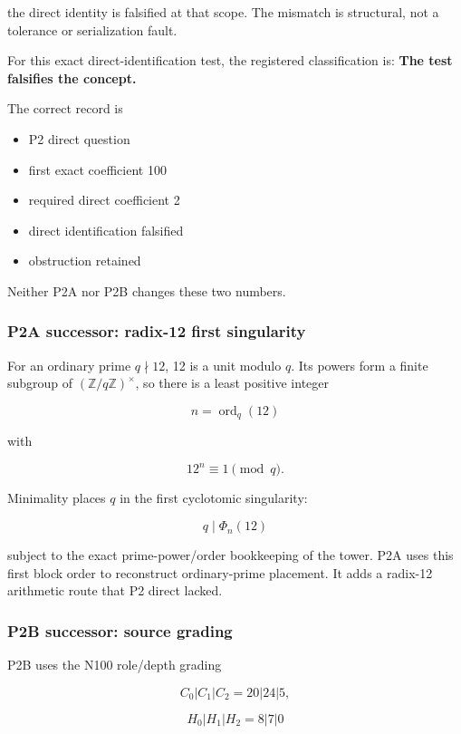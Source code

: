 the direct identity is falsified at that scope. The mismatch is
structural, not a tolerance or serialization fault.

For this exact direct-identification test, the registered classification
is: \textbf{The test falsifies the concept.}

The correct record is

\begin{itemize}
\tightlist
\item
  P2 direct question
\item
  first exact coefficient 100
\item
  required direct coefficient 2
\item
  direct identification falsified
\item
  obstruction retained
\end{itemize}

Neither P2A nor P2B changes these two numbers.

\subsubsection{P2A successor: radix-12 first
singularity}\label{viii-ch09-p2a-successor-radix-12-first-singularity}

For an ordinary prime \(q\nmid12\), 12 is a unit modulo \(q\). Its
powers form a finite subgroup of \((\mathbb Z/q\mathbb Z)^\times\), so
there is a least positive integer

\[
n=\operatorname{ord}_q(12)
\]

with

\[
12^n\equiv1\pmod q.
\]

Minimality places \(q\) in the first cyclotomic singularity:

\[
q\mid\Phi_n(12)
\]

subject to the exact prime-power/order bookkeeping of the tower. P2A
uses this first block order to reconstruct ordinary-prime placement. It
adds a radix-12 arithmetic route that P2 direct lacked.

\subsubsection{P2B successor: source
grading}\label{viii-ch09-p2b-successor-source-grading}

P2B uses the N100 role/depth grading

\[
C_0|C_1|C_2=20|24|5,
\]

\[
H_0|H_1|H_2=8|7|0
\]

